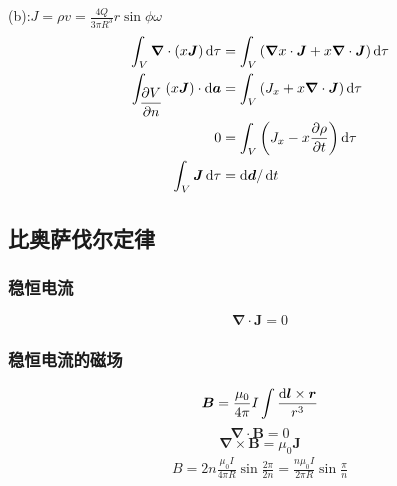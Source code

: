 (b):$J=\rho v=\frac{4Q}{3\pi R^3}r\sin\phi\omega$
\begin{align*}
    \int_V\boldsymbol{\nabla}\cdot\left(x\boldsymbol{J}\right)\dif\tau&=
    \int_V\left(\boldsymbol{\nabla} x\cdot\boldsymbol{J}
    +x\boldsymbol{\nabla}\cdot \boldsymbol{J}\right)\dif\tau\\
    \int_{\dfrac{\partial V}{\partial n}}\left(x\boldsymbol{J}\right)\cdot\dif\boldsymbol{a}&=
    \int_V\left(J_x
    +x\boldsymbol{\nabla}\cdot \boldsymbol{J}\right)\dif\tau\\
    0&=
    \int_V\left(J_x
    -x \frac{\partial \rho}{\partial t}\right)\dif\tau\\
    \int_V\boldsymbol{J}\dif\tau&=\dif\boldsymbol{d}/\dif t
\end{align*}
\subsection{比奥萨伐尔定律}
\subsubsection{稳恒电流}
\begin{equation}
    \boldsymbol{\nabla}\cdot\boldsymbol{J}=0
\end{equation}
\subsubsection{稳恒电流的磁场}
\begin{equation}
    \boldsymbol{B}=\frac{\mu_0}{4\pi}I\int\frac{\dif \boldsymbol{l}\times\boldsymbol{r}}{r^3}
\end{equation}
\begin{equation}
    \boldsymbol{\nabla}\cdot\boldsymbol{B}=0
\end{equation}
\begin{equation}
    \boldsymbol{\nabla}\times\boldsymbol{B}=\mu_0\boldsymbol{J}
\end{equation}
\begin{align*}
    B=2n\frac{\mu_0 I}{4\pi R}\sin\frac{2\pi}{2n}=\frac{n\mu_0 I}{2\pi R}\sin\frac{\pi}{n}
\end{align*}

